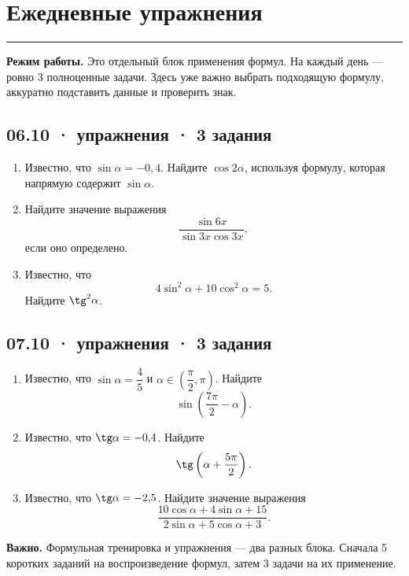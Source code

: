 \documentclass[a4paper,12pt]{article}
\newcommand{\sectionline}{\vspace{-1mm}\noindent\color{accent}\rule{\linewidth}{0.7pt}\color{textgray}\vspace{2mm}}
\newcommand{\key}[1]{\textbf{\color{darkaccent}#1}}
\begin{document}
\clearpage

\section*{Ежедневные упражнения}
\sectionline

\textbf{Режим работы.} Это отдельный блок применения формул. На каждый день --- ровно 3 полноценные задачи. Здесь уже важно выбрать подходящую формулу, аккуратно подставить данные и проверить знак.

\subsection*{06.10 · упражнения · 3 задания}
\begin{enumerate}[label=\textbf{У\arabic*.}]
  \item Известно, что \(\sin\alpha=-0{,}4\). Найдите \(\cos 2\alpha\), используя формулу, которая напрямую содержит \(\sin\alpha\).

  \item Найдите значение выражения
  \[
    \frac{\sin 6x}{\sin 3x\cos 3x},
  \]
  если оно определено.

  \item Известно, что
  \[
    4\sin^2\alpha+10\cos^2\alpha=5.
  \]
  Найдите \(\tg^2\alpha\).
\end{enumerate}

\subsection*{07.10 · упражнения · 3 задания}
\begin{enumerate}[label=\textbf{У\arabic*.}]
  \item Известно, что \(\sin\alpha=\dfrac45\) и \(\alpha\in\left(\dfrac\pi2,\pi\right)\). Найдите
  \[
    \sin\left(\frac{7\pi}{2}-\alpha\right).
  \]

  \item Известно, что \(\tg\alpha=-0{,}4\). Найдите
  \[
    \tg\left(\alpha+\frac{5\pi}{2}\right).
  \]

  \item Известно, что \(\tg\alpha=-2{,}5\). Найдите значение выражения
  \[
    \frac{10\cos\alpha+4\sin\alpha+15}
         {2\sin\alpha+5\cos\alpha+3}.
  \]
\end{enumerate}

\vspace{2mm}
\key{Важно.} Формульная тренировка и упражнения --- два разных блока. Сначала 5 коротких заданий на воспроизведение формул, затем 3 задачи на их применение.
\end{document}

